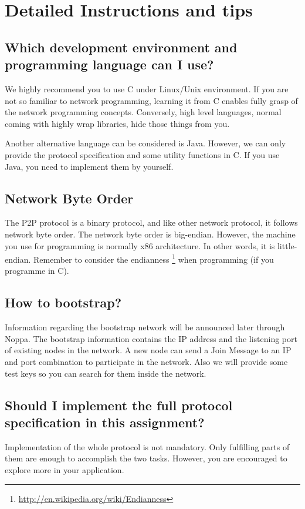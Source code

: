 \documentclass[12pt, a4paper]{article}
\begin{document}
\section{Detailed Instructions and tips}
\subsection*{Which development environment and programming language can I use?}
We highly recommend you to use C under Linux/Unix environment.
If you are not so familiar to network programming, learning it from C enables fully grasp of the network programming concepts.
Conversely, high level languages, normal coming with highly wrap libraries, hide those things from you.

Another alternative language can be considered is Java.
However, we can only provide the protocol specification and some utility functions in C.
If you use Java, you need to implement them by yourself.

\subsection*{Network Byte Order}
The P2P protocol is a binary protocol, and like other network protocol, it follows network byte order.
The network byte order is big-endian.
However, the machine you use for programming is normally x86 architecture.
In other words, it is little-endian.
Remember to consider the endianness \footnote{\url{http://en.wikipedia.org/wiki/Endianness}} when programming (if you programme in C).

\subsection*{How to bootstrap?}
Information regarding the bootstrap network will be announced later through Noppa.
The bootstrap information contains the IP address and the listening port of existing nodes in the network.
A new node can send a Join Message to an IP and port combination to participate in the network.
Also we will provide some test keys so you can search for them inside the network.

\subsection*{Should I implement the full protocol specification in this assignment?}
Implementation of the whole protocol is not mandatory.
Only fulfilling parts of them are enough to accomplish the two tasks.
However, you are encouraged to explore more in your application.
\end{document}
